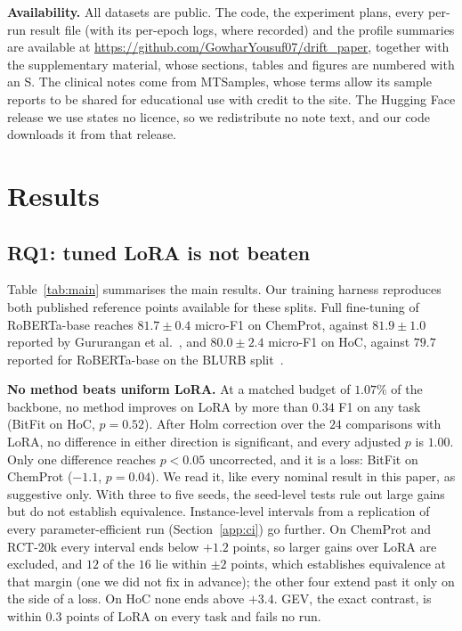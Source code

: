 \documentclass[conference]{IEEEtran}
\begin{document}
\noindent\textbf{Availability.}
All datasets are public. The code, the experiment plans, every per-run result
file (with its per-epoch logs, where recorded) and the profile summaries are
available at \url{https://github.com/GowharYousuf07/drift_paper}, together with
the supplementary material, whose sections, tables and figures are numbered with
an S. The clinical notes come from MTSamples, whose terms allow its sample
reports to be shared for educational use with credit to the site. The Hugging
Face release we use states no licence, so we redistribute no note text, and our
code downloads it from that release.

\section{Results}
\label{sec:results}



\subsection{RQ1: tuned LoRA is not beaten}
\label{sec:main}

Table~\ref{tab:main} summarises the main results. Our training harness
reproduces both published reference points available for these splits. Full
fine-tuning of RoBERTa-base reaches $81.7\pm0.4$ micro-F1 on ChemProt, against
$81.9\pm1.0$ reported by Gururangan et al.~\cite{gururangan2020dapt}, and
$80.0\pm2.4$ micro-F1 on HoC, against $79.7$ reported for RoBERTa-base on the
BLURB split~\cite{gu2021pubmedbert}.

\noindent\textbf{No method beats uniform LoRA.} At a matched budget of
$1.07\%$ of the backbone, no method improves on LoRA by more than $0.34$ F1 on
any task (BitFit on HoC, $p = 0.52$). After Holm correction over the $24$
comparisons with LoRA, no difference in either direction is significant, and
every adjusted $p$ is $1.00$. Only one difference reaches $p < 0.05$
uncorrected, and it is a loss: BitFit on ChemProt ($-1.1$, $p = 0.04$). We read
it, like every nominal result in this paper, as suggestive only. With three to
five seeds, the seed-level tests rule out large gains but do not establish
equivalence. Instance-level intervals from a replication of every
parameter-efficient run (Section~\ref{app:ci}) go further. On ChemProt and
RCT-20k every interval ends below $+1.2$ points, so larger gains over LoRA are
excluded, and $12$ of the $16$ lie within $\pm2$ points, which establishes
equivalence at that margin (one we did not fix in advance); the other four
extend past it only on the side of a loss. On HoC none ends above $+3.4$. GEV,
the exact contrast, is within $0.3$ points of LoRA on every task and fails no run.
\end{document}
